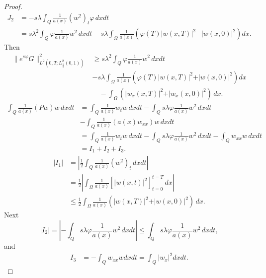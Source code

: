 \documentclass[reqno]{amsart}
\theoremstyle{plain}
\theoremstyle{remark}
\numberwithin{equation}{section}
\begin{document}
\begin{proof}
\begin{equation}
    \begin{aligned}
    J_{2} &= -s\lambda \int_{Q} \frac{1}{a(x)}\left(w^2\right)_{t}\varphi\, dxdt\\
     &= s\lambda^2 \int_{Q}\varphi \frac{1}{a(x)} w^2 \, dx dt-s\lambda \int_{\Omega}\frac{1}{a(x)}\left(\varphi(T)\vert w(x,T)\vert^2-\vert w(x,0)\vert^2\right)dx.
\end{aligned}
\end{equation}
Then
\begin{equation}\label{5}
\begin{aligned}
    \| e^{s\varphi}G\|^2_{L^2(0,T;L^2_{\frac{1}{a}}(0,1))} &\geqslant s\lambda^2 \int_{Q}\varphi\frac{1}{a(x)} w^2 \,dxdt \\& -s\lambda \int_{\Omega} \frac{1}{a(x)}\left(\varphi(T)\vert w(x,T)\vert^2+\vert w(x,0)\vert^2\right)dx\\& \quad -\int_{\Omega}\left( \vert w_{x}(x,T)\vert^2+\vert w_{x}(x,0)\vert^2\right)\, dx.
\end{aligned}
\end{equation}
\begin{equation*}\label{6}
    \begin{aligned}
    \int_{Q}\frac{1}{a(x)}\left(Pw\right)w\, dxdt&=\int_{Q} \frac{1}{a(x)}w_{t}w\, dx dt - \int_{Q}s\lambda \varphi\frac{1}{a(x)} w^2\, dx dt\\&- \int_{Q} \frac{1}{a(x)} \left( a(x)w_{xx}\right)w \,dxdt\\
    &= \int_{Q} \frac{1}{a(x)}w_{t}w\, dxdt -\int_{Q}s\lambda \varphi\frac{1}{a(x)} w^2\, dxdt- \int_{Q} w_{xx}w \,dxdt\\
    &  =I_{1}+I_{2}+I_{3}.
\end{aligned}
\end{equation*}
\begin{align*}
   \left\vert I_{1}\right\vert &= \left\vert \frac{1}{2} \int_{Q}\frac{1}{a(x)}(w^2)_{t} \, dxdt\right\vert\\ & =\frac{1}{2}\left\vert \int_{\Omega}\frac{1}{a(x)}\left[ \vert w(x,t)\vert^2\right]_{t=0}^{t=T}\, dx\right\vert \\&\leqslant \frac{1}{2}\int_{\Omega}\frac{1}{a(x)}\left(\vert w(x,T)\vert^2+\vert w(x,0)\vert^2 \right)\, dx.
\end{align*}
Next
$$ \vert I_{2}\vert = \left\vert -\int_{Q} s\lambda \varphi \frac{1}{a(x)} w^2\, dxdt\right\vert \leq  \int_{Q} s\lambda \varphi \frac{1}{a(x)} w^2 \, dxdt,$$
and 
\begin{align*}
     I_{3}&= -\int_{Q}w_{xx}w dxdt= \int_{Q}\vert w_{x}\vert^2  dxdt.

\end{align*}
\end{proof}
\end{document}
